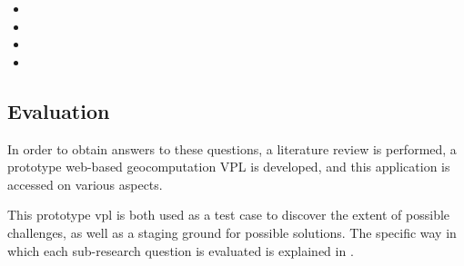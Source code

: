 \begin{itemize}[-]
  \item \mySubRQOne
  \item \mySubRQTwo
  \item \mySubRQThree
  \item \mySubRQFour
\end{itemize}

\subsection*{Evaluation}
In order to obtain answers to these questions, a literature review is performed,
a prototype web-based geocomputation VPL is developed, 
and this application is accessed on various aspects.

This prototype vpl is both used as a test case to discover the extent of possible challenges, as well as a staging ground for possible solutions. 
The specific way in which each sub-research question is evaluated is explained in .





